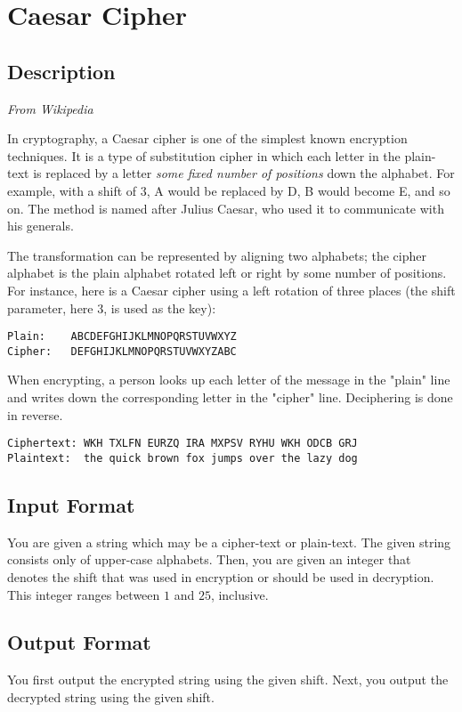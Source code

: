 \newpage

\section{Caesar Cipher}
\subsection*{Description}
\textit{From Wikipedia} 

In cryptography, a Caesar cipher is one of the simplest known encryption techniques.  It is a type of substitution cipher in which each letter in the plain-text is replaced by a letter \textit{some fixed number of positions} down the alphabet. For example, with a shift of $3$, A would be replaced by D, B would become E, and so on. The method is named after Julius Caesar, who used it to communicate with his generals.


The transformation can be represented by aligning two alphabets; the cipher alphabet is the plain alphabet rotated left or right by some number of positions. For instance, here is a Caesar cipher using a left rotation of three places (the shift parameter, here 3, is used as the key):
\begin{verbatim}
Plain:    ABCDEFGHIJKLMNOPQRSTUVWXYZ
Cipher:   DEFGHIJKLMNOPQRSTUVWXYZABC
\end{verbatim}

When encrypting, a person looks up each letter of the message in the "plain" line and writes down the corresponding letter in the "cipher" line. Deciphering is done in reverse.
\begin{verbatim}
Ciphertext: WKH TXLFN EURZQ IRA MXPSV RYHU WKH ODCB GRJ
Plaintext:  the quick brown fox jumps over the lazy dog
\end{verbatim}

\subsection*{Input Format}
You are given a string which may be a cipher-text or plain-text. The given string consists only of upper-case alphabets.  Then, you are given an integer that denotes the shift that was used in encryption or should be used in decryption.  This integer ranges between $1$ and $25$, inclusive. 

\subsection*{Output Format}
You first output the encrypted string using the given shift.
Next, you output the decrypted string using the given shift. 

